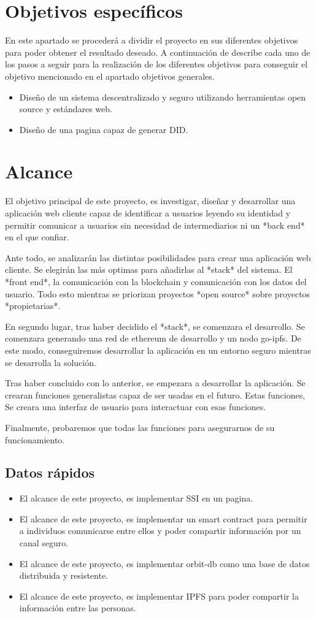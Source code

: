 \section*{Objetivos específicos}
En este apartado se procederá a dividir el proyecto en sus diferentes objetivos para poder
obtener el resultado deseado. A continuación de describe cada uno de los pasos a seguir para la realización de los diferentes objetivos para conseguir el objetivo mencionado en el apartado objetivos generales.
\begin{itemize}
    \item Diseño de un sistema descentralizado y seguro utilizando herramientas open source y estándares web.
    \item Diseño de una pagina capaz de generar DID.
\end{itemize}
\section*{Alcance}
El objetivo principal de este proyecto, es investigar, diseñar y desarrollar una aplicación web cliente capaz de identificar a usuarios leyendo su identidad y permitir comunicar a usuarios sin necesidad de intermediarios ni un *back end* en el que confiar.

Ante todo, se analizarán las distintas posibilidades para crear una aplicación web cliente. Se elegirán las más optimas para añadirlas al *stack* del sistema. El *front end*, la comunicación con la blockchain y comunicación con los datos del usuario. Todo esto mientras se priorizan proyectos *open source* sobre proyectos *propietarias*.

En segundo lugar, tras haber decidido el *stack*, se comenzara el desarrollo. Se comenzara generando una red de ethereum de desarrollo y un nodo go-ipfs. De este modo, conseguiremos desarrollar la aplicación en un entorno seguro mientras se desarrolla la solución.

Tras haber concluido con lo anterior, se empezara a desarrollar la aplicación. Se crearan funciones generalistas capaz de ser usadas en el futuro. Estas funciones,  Se creara una interfaz de usuario para interactuar con esas funciones.

Finalmente, probaremos que todas las funciones para asegurarnos de su funcionamiento.
\subsection*{Datos rápidos}
\begin{itemize}
    \item El alcance de este proyecto, es implementar SSI en un pagina.
    \item El alcance de este proyecto, es implementar un smart contract para permitir a individuos comunicarse entre ellos y poder compartir información por un canal seguro.
    \item El alcance de este proyecto, es implementar orbit-db como una base de datos distribuida y resistente.
    \item El alcance de este proyecto, es implementar IPFS para poder compartir la información entre las personas.
\end{itemize}
